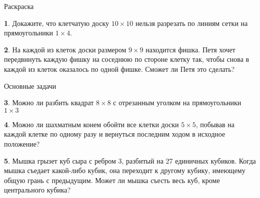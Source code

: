 \documentclass[b5paper,usehyperref, twoside]{article}
\theoremstyle{definition}
\theoremstyle{definition}
\newtheorem{Task}{}
\begin{document}
	
	
	
	\centerline{\LARGE Раскраска}
	
	
	
	
	
\begin{Task}
	Докажите, что клетчатую доску $10 \times 10$ нельзя разрезать по линиям сетки на прямоугольники $1\times 4$.
\end{Task}

\begin{Task}
	На каждой из клеток доски размером $9 \times 9$ находится фишка. Петя хочет передвинуть каждую фишку на соседнюю по стороне клетку так, чтобы снова в каждой из клеток оказалось по одной фишке. Сможет ли Петя это сделать?
\end{Task}

\centerline{\LARGE Основные задачи}
	
\begin{Task}
	Можно ли разбить квадрат $8 \times 8$ с отрезанным уголком на прямоугольники $1 \times 3$
\end{Task}

\begin{Task}
	Можно ли шахматным конем обойти все клетки доски $5 \times 5$, побывав на каждой клетке по одному разу и вернуться последним ходом в исходное положение?
\end{Task}

\begin{Task}
	Мышка грызет куб сыра с ребром 3, разбитый на 27 единичных кубиков. Когда мышка съедает какой-либо кубик, она переходит к другому кубику, имеющему общую грань с предыдущим. Может ли мышка съесть весь куб, кроме центрального кубика?
\end{Task}
\end{document}

